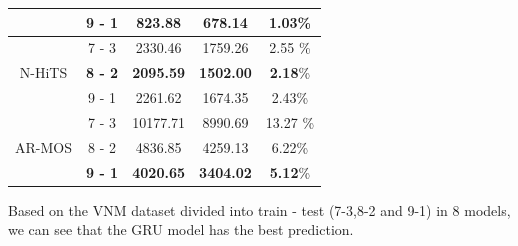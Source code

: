 \documentclass{ieeeojies}
\begin{document}
\begin{table}[h]
{\begin{tabular}{|c|c|c|c|c|}
    \cline{2-5}
    & 9 - 1 & 823.88 & 678.14 & 1.03\% \\
    \hline
    \multirow{3}{*}{N-HiTS} & 7 - 3 & 2330.46 & 1759.26 & 2.55 \%\\
    \cline{2-5}
    & \textbf{8 - 2} & \textbf{2095.59 }& \textbf{1502.00} & \textbf{2.18}\% \\
    \cline{2-5}
    & 9 - 1 & 2261.62 & 1674.35 & 2.43\% \\
    \hline
    \multirow{3}{*}{AR-MOS} & 7 - 3 & 10177.71 & 8990.69 & 13.27 \%\\
    \cline{2-5}
    & 8 - 2 & 4836.85 & 4259.13 & 6.22\% \\
    \cline{2-5}
    &\textbf{ 9 - 1 }& \textbf{4020.65 }& \textbf{3404.02 }& \textbf{5.12}\% \\
    \hline
\end{tabular}%
}
\end{table}
Based on the VNM dataset divided into train - test (7-3,8-2 and 9-1) in 8 models, we can see that the GRU model has the best prediction.
\end{document}
